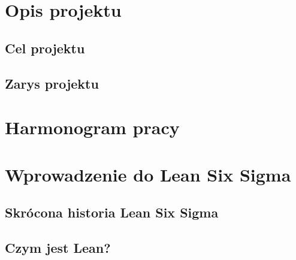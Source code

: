 


                   

\chapter{Opis projektu}
\section{Cel projektu}
  

\section{Zarys projektu}
  

\chapter{Harmonogram pracy}
	
	
\chapter{Wprowadzenie do Lean Six Sigma}
	

\section{Skrócona historia Lean Six Sigma}
	

\section{Czym jest Lean?}
	








